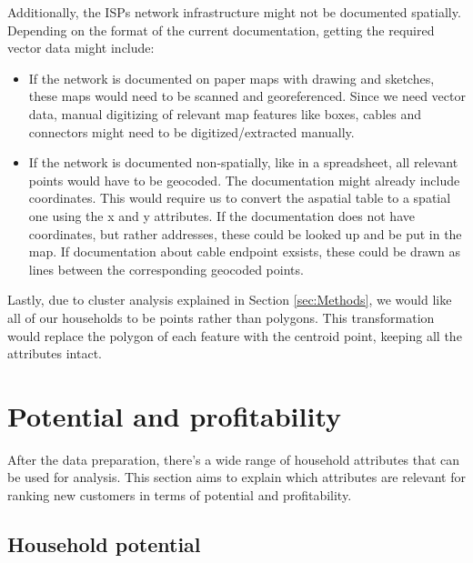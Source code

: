 \documentclass[twocolumn]{article}
\begin{document}
Additionally, the ISPs network infrastructure might not be documented spatially. Depending on the format of the current documentation, getting the required vector data might include:
\begin{itemize}
  \item If the network is documented on paper maps with drawing and sketches, these maps would need to be scanned and georeferenced. Since we need vector data, manual digitizing of relevant map features like boxes, cables and connectors might need to be digitized/extracted manually.
  \item If the network is documented non-spatially, like in a spreadsheet, all relevant points would have to be geocoded. The documentation might already include coordinates. This would require us to convert the aspatial table to a spatial one using the x and y attributes. If the documentation does not have coordinates, but rather addresses, these could be looked up and be put in the map. If documentation about cable endpoint exsists, these could be drawn as lines between the corresponding geocoded points.
  \end{itemize}

Lastly, due to cluster analysis explained in Section \ref{sec:Methods}, we would like all of our households to be points rather than polygons. This transformation would replace the polygon of each feature with the centroid point, keeping all the attributes intact.


\section{Potential and profitability}
\label{sec:Potential and profitability}
After the data preparation, there's a wide range of household attributes that can be used for analysis. This section aims to explain which attributes are relevant for ranking new customers in terms of potential and profitability.

\subsection{Household potential}
\label{sub:Potential}
\end{document}

